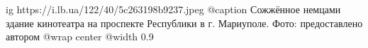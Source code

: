 
 
 
 
 

\ifcmt
  ig https://i.lb.ua/122/40/5c263198b9237.jpeg
	@caption Сожжённое немцами здание кинотеатра на проспекте Республики в г. Мариуполе. Фото: предоставлено автором
  @wrap center
  @width 0.9
\fi

